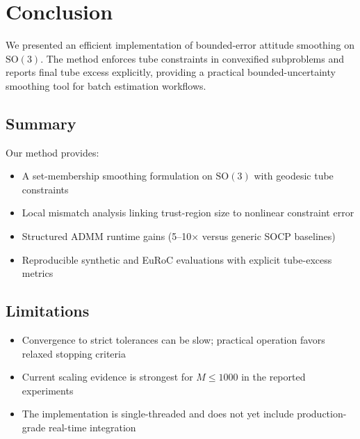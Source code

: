 \documentclass[letterpaper, 10 pt, conference]{ieeeconf}
\newcommand{\SO}{\mathrm{SO}(3)}
\begin{document}


\section{Conclusion}
\label{sec:conclusion}

We presented an efficient implementation of bounded-error attitude smoothing on $\SO$. The method enforces tube constraints in convexified subproblems and reports final tube excess explicitly, providing a practical bounded-uncertainty smoothing tool for batch estimation workflows.

\subsection{Summary}

Our method provides:
\begin{itemize}
\item A set-membership smoothing formulation on $\SO$ with geodesic tube constraints
\item Local mismatch analysis linking trust-region size to nonlinear constraint error
\item Structured ADMM runtime gains (5--10$\times$ versus generic SOCP baselines)
\item Reproducible synthetic and EuRoC evaluations with explicit tube-excess metrics
\end{itemize}

\subsection{Limitations}

\begin{itemize}
\item Convergence to strict tolerances can be slow; practical operation favors relaxed stopping criteria
\item Current scaling evidence is strongest for $M \leq 1000$ in the reported experiments
\item The implementation is single-threaded and does not yet include production-grade real-time integration
\end{itemize}
\end{document}
